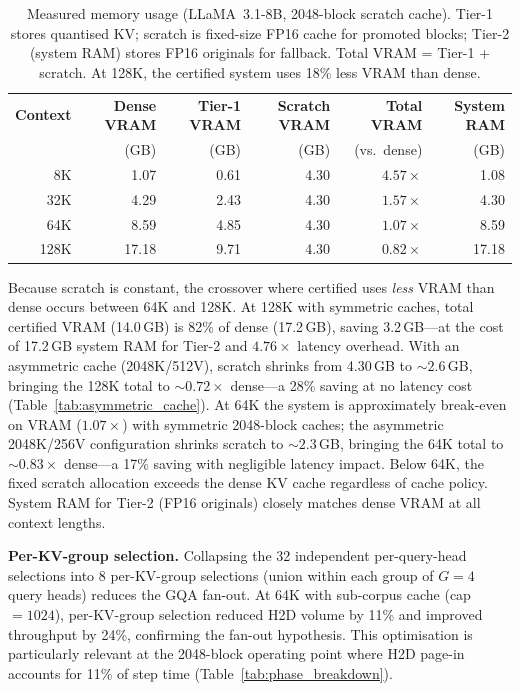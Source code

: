 \documentclass[10pt,twocolumn,a4paper]{article}
\theoremstyle{definition}
\theoremstyle{remark}
\begin{document}
\begin{table}[!t]
\centering
\caption{Measured memory usage (LLaMA~3.1-8B, 2048-block scratch cache).  Tier-1 stores quantised KV; scratch is fixed-size FP16 cache for promoted blocks; Tier-2 (system RAM) stores FP16 originals for fallback.  Total VRAM = Tier-1 + scratch.  At 128K, the certified system uses 18\% less VRAM than dense.}
\label{tab:memory}
\small
\begin{tabular}{rrrrrr}
\toprule
\textbf{Context} & \textbf{Dense VRAM} & \textbf{Tier-1 VRAM} & \textbf{Scratch VRAM} & \textbf{Total VRAM} & \textbf{System RAM} \\
 & (GB) & (GB) & (GB) & (vs.\ dense) & (GB) \\
\midrule
8K   & 1.07 & 0.61 & 4.30 & $4.57\times$ & 1.08 \\
32K  & 4.29 & 2.43 & 4.30 & $1.57\times$ & 4.30 \\
64K  & 8.59 & 4.85 & 4.30 & $1.07\times$ & 8.59 \\
\rowcolor[gray]{0.92}
128K & 17.18 & 9.71 & 4.30 & $0.82\times$ & 17.18 \\
\bottomrule
\end{tabular}
\end{table}

Because scratch is constant, the crossover where certified uses \emph{less} VRAM than dense occurs between 64K and 128K.  At 128K with symmetric caches, total certified VRAM (14.0\,GB) is 82\% of dense (17.2\,GB), saving 3.2\,GB---at the cost of 17.2\,GB system RAM for Tier-2 and $4.76\times$ latency overhead.  With an asymmetric cache (2048K/512V), scratch shrinks from 4.30\,GB to ${\sim}2.6$\,GB, bringing the 128K total to ${\sim}0.72\times$ dense---a 28\% saving at no latency cost (Table~\ref{tab:asymmetric_cache}).  At 64K the system is approximately break-even on VRAM ($1.07\times$) with symmetric 2048-block caches; the asymmetric 2048K/256V configuration shrinks scratch to ${\sim}2.3$\,GB, bringing the 64K total to ${\sim}0.83\times$ dense---a 17\% saving with negligible latency impact.  Below 64K, the fixed scratch allocation exceeds the dense KV cache regardless of cache policy.  System RAM for Tier-2 (FP16 originals) closely matches dense VRAM at all context lengths.

\textbf{Per-KV-group selection.}  Collapsing the 32 independent per-query-head selections into 8 per-KV-group selections (union within each group of $G{=}4$ query heads) reduces the GQA fan-out.  At 64K with sub-corpus cache (cap${}=1024$), per-KV-group selection reduced H2D volume by 11\% and improved throughput by 24\%, confirming the fan-out hypothesis.  This optimisation is particularly relevant at the 2048-block operating point where H2D page-in accounts for 11\% of step time (Table~\ref{tab:phase_breakdown}).
\end{document}
